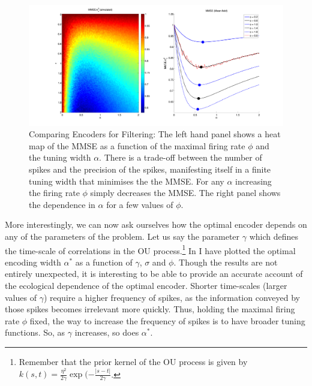 \begin{figure}
\label{fig:mmse_ou}
\includegraphics[width=\columnwidth]{figures/figure_5_3.png}
\caption{Comparing Encoders for Filtering: The left hand panel shows a heat map of the MMSE as a function of the maximal firing rate $\phi$ and the tuning
width $\alpha$. There is a trade-off between the number of spikes and the precision of the spikes, manifesting itself in a finite tuning width that minimises the
the MMSE. For any $\alpha$ increasing the firing rate $\phi$ simply decreases the MMSE. The right panel shows the dependence in $\alpha$ for a few values
of $\phi$.}
\end{figure}

More interestingly, we can now ask ourselves how the optimal encoder depends on any of the parameters of the problem. Let us say the parameter $\gamma$
which defines the time-scale of correlations in the OU process.\footnote{Remember that the prior kernel of the OU process is given by $k(s,t) = \frac{\eta^2}{2\gamma} \exp(-\frac{|s-t|}{2\gamma}$.} In  I have plotted the optimal encoding width $\alpha^*$ as a function of $\gamma$, $\sigma$ and
$\phi$. Though the results are not entirely unexpected, it is interesting to be able to provide an accurate account of the ecological dependence of the optimal 
encoder. Shorter time-scales (larger values of $\gamma$) require a higher frequency of spikes, as the information conveyed by those spikes becomes irrelevant
more quickly. Thus, holding the maximal firing rate $\phi$ fixed, the way to increase the frequency of spikes is to have broader tuning functions. So, as $\gamma$
increases, so does $\alpha^*$.

